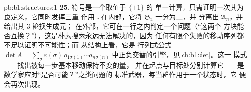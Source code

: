\begin{solution}{pb:b1:structures:1}
\textbf{25.} 符号是一个取值于 $\{\pm1\}$ 的
单一计算，只需证明一次其为良定义，它同时发挥三重
作用：在内部，它将 $\mathfrak S_n$ 一分为二，并
分离出 $\mathfrak A_n$，并给出其 $3$-轮换生成元；
在外部，它可在一行之内判定一个问题（“这两个
方块能否互换？”），这是朴素搜索永远无法解决的，因为
任何有限个失败的移动序列都不足以证明不可能性；而
从结构上看，它是
行列式公式 $\det A = \sum_\sigma \varepsilon(\sigma)\,
a_{1\sigma(1)}\cdots a_{n\sigma(n)}$ 中正负交替的引擎，见\cref{ch:b1:det}。这一
模式——找出被每一步基本移动保持不变的量，
并在起点与目标处分别计算它——是
数学家应对“是否可能？”之类问题的
标准武器，每当群作用于一个状态时，它
便会再次出现。
\end{solution}
